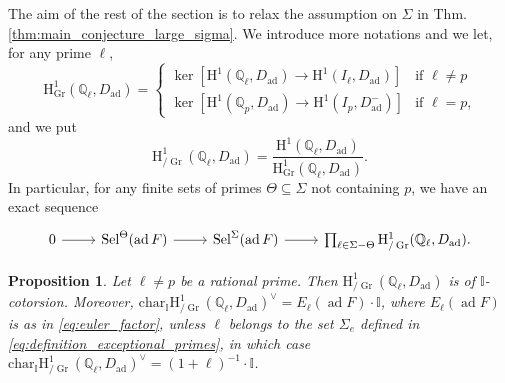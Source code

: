 \documentclass[12pt]{amsart}
\newcommand\bI{\mathbb{I}}
\newcommand\bQ{\mathbb{Q}}
\renewcommand{\char}{\textrm{char}}
\DeclareMathOperator{\ad}{ad}
\DeclareMathOperator{\Sel}{Sel}
\DeclareMathOperator{\Gr}{Gr}
\newcommand{\HH}{\mathrm{H}}
\theoremstyle{defstyle}
\theoremstyle{thmstyle}
\newtheorem{proposition}[subsubsection]{Proposition}
\begin{document}
The aim of the rest of the section is to relax the assumption on $\Sigma$ in Thm. \ref{thm:main_conjecture_large_sigma}.
We introduce more notations and we let, for any prime $\ell$, 
\begin{equation}\label{eq:euler_factor_selmer_group}
	\HH^1_{\Gr}(\bQ_\ell,D_{\ad})=\left\{\begin{array}{ll}
		\ker\left[\HH^1(\bQ_\ell,D_{\ad}) \to \HH^1(I_\ell,D_{\ad})\right] & \mbox{if $\ell\neq p$} \\ 
		\ker\left[\HH^1(\bQ_p,D_{\ad}) \to \HH^1(I_p,D^-_{\ad})\right] & \mbox{if $\ell= p$,}
	\end{array}\right.
\end{equation}
and we put 
\begin{equation}
	\HH^1_{\slash\Gr}(\bQ_\ell,D_{\ad})=\dfrac{\HH^1(\bQ_\ell,D_{\ad})}{\HH^1_{\Gr}(\bQ_\ell,D_{\ad})}.
\end{equation}
In particular, for any finite sets of primes $\Theta\subseteq \Sigma$ not containing $p$, we have an exact sequence
\[\begin{tikzcd}
	0 \rar & \Sel^{\Theta}(\ad F) \rar & \Sel^\Sigma(\ad F) \rar & \prod_{\ell\in \Sigma-\Theta} \HH^1_{\slash\Gr}(\bQ_\ell,D_{\ad}).
\end{tikzcd}\]
\begin{proposition}\label{prop:calcul_euler_factors_selmer}
Let $\ell \neq p$ be a rational prime. Then $\HH^1_{\slash\Gr}(\bQ_\ell,D_{\ad})$ is of $\bI$-cotorsion. Moreover, $\char_{\bI} \HH^1_{\slash\Gr}(\bQ_\ell,D_{\ad})^\vee=E_\ell(\ad F)\cdot\bI$, where $E_\ell(\ad F)$ is as in \eqref{eq:euler_factor}, unless $\ell$ belongs to the set $\Sigma_e$ defined in \eqref{eq:definition_exceptional_primes}, in which case $\char_{\bI} \HH^1_{\slash\Gr}(\bQ_\ell,D_{\ad})^\vee=(1+\ell)^{-1}\cdot\bI$.
\end{proposition}
\end{document}
